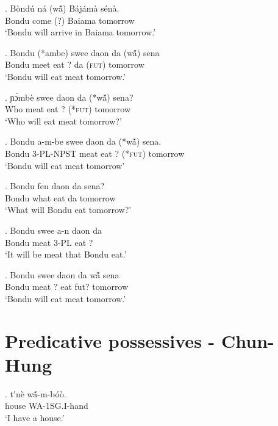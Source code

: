 \documentclass{assets/fieldnotes}
\begin{document}
\exg. Bòndú ná (w\'ã) Bájámà sénà.\\
Bondu come (?) Baiama tomorrow\\
`Bondu will arrive in Baiama tomorrow.'

\exg. Bondu (*ambe) swee daon da (w\'ã) sena\\
Bondu meet eat ? da (\textsc{fut}) tomorrow\\
`Bondu will eat meat tomorrow.'

\exg. ɲɔ́mbè swee daon da (*w\'ã) sena?\\
Who meat eat ? (*\textsc{fut}) tomorrow\\
`Who will eat meat tomorrow?'

\exg. Bondu a-m-be swee daon da (*w\'ã) sena.\\
Bondu 3-PL-NPST meat eat ? (*\textsc{fut}) tomorrow\\
`Bondu will eat meat tomorrow' 





\exg. Bondu fen daon da sena?\\
Bondu what eat da tomorrow\\
`What will Bondu eat tomorrow?'

\exg. Bondu swee a-n daon da\\
Bondu meat 3-PL eat ?\\
`It will be meat that Bondu eat.'

\exg. Bondu swee daon da w\'ã sena \\
Bondu meat ? eat fut? tomorrow\\
`Bondu will eat meat tomorrow.'

\section{Predicative possessives - Chun-Hung}



\exg. t\'{}n\`{e} wã́-m-b\'{o}\`{o}. \\
house WA-1SG.I-hand \\
`I have a house.'
\end{document}

